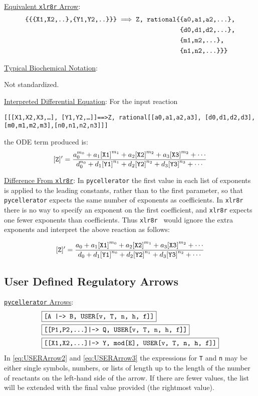 \underline{Equivalent {\tt xlr8r} Arrow}: 
\begin{align*}
{\text{\tt\{\{\{X1,X2,..\},\{Y1,Y2,..\}\}\}}}\implies{\text{\tt Z, rational\{}}&{\text{\tt\{a0,a1,a2,...\},}}\\
&{\text{\tt\{d0,d1,d2,...\},}}\\
&{\text{\tt\{m1,m2,...\},}}\\
&{\text{\tt\{n1,n2,...\}\}\}}}
\end{align*}


\underline{Typical Biochemical Notation}: 

Not standardized.

\underline{Interpreted Differential Equation}:
For the input reaction
\begin{center}
{\tt [[[X1,X2,X3,\dots], [Y1,Y2,\dots]]==>Z, rational[[a0,a1,a2,a3], [d0,d1,d2,d3],[m0,m1,m2,m3],[n0,n1,n2,n3]]]}
\end{center}
the ODE term produced is: 
\begin{equation*}
{\tt [Z]'} = 
\dfrac{a_0^{m_0} + a_1{\tt [X1]}^{m_1} + a_2{\tt [X2]}^{m_2} + a_3{\tt [X3]}^{m_2} + \cdots}
{d_0^{n_0} + d_1{\tt {[Y1]}}^{n_1} + d_2{\tt [Y2]}^{n_2} + d_3{\tt [Y3]}^{n_3}+ \cdots}
\end{equation*}

\underline{Difference From {\tt xlr8r}}: In {\tt pycellerator} the first value in each list of exponents is applied to the leading constants, rather than to the first parameter, so that {\tt pycellerator} expects the same number of exponents as coefficients. In {\tt xlr8r} there is no way to specify an exponent on the first coefficient, and {\tt xlr8r} expects one fewer exponents than coefficients. Thus {\tt xlr8r } would ignore the extra exponents and interpret the above reaction as follows: 

\begin{equation*}
{\tt [Z]'} = 
\dfrac{a_0 + a_1{\tt [X1]}^{m_0} + a_2{\tt [X2]}^{m_1} + a_3{\tt [X3]}^{m_2} + \cdots}
{d_0 + d_1{\tt [Y1]}^{n_0} + d_2{\tt [Y2]}^{n_1} + d_3{\tt [Y3]}^{n_2}+ \cdots}
\end{equation*}

\subsection{User Defined Regulatory Arrows}


\label{subsection:USER}
\underline{{\tt pycellerator} Arrows}:
\begin{align}
& \fbox{\ensuremath{\text{\tt{[A |-> B, USER[v, T, n, h, f]]}}}} \label{eq:USERArrow1}\\
& \fbox{\ensuremath{\text{\tt{[[P1,P2,...]|->  Q, USER[v, T, n, h, f]]}}}} \label{eq:USERArrow2} \\
& \fbox{\ensuremath{\text{\tt{[[X1,X2,...]|--> Y, mod[E], USER[v, T, n, h, f]]}}}} \label{eq:USERArrow3}
\end{align}
In \eqref{eq:USERArrow2} and \eqref{eq:USERArrow3} the expressions for {\tt T} and {\tt n} may be either single symbols, numbers, or lists of length up to the length of the number of reactants on the left-hand side of the arrow. If there are fewer values, the list will be extended with the final value provided (the rightmost value). 


